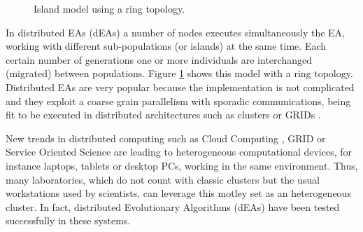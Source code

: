\documentclass[final,1p,times]{elsarticle}
\begin{document}
\begin{figure}[htb]
\centering
{}
\caption{Island model using a ring topology.}
\label{fig:islands}
\end{figure}


In distributed EAs (dEAs) a number of nodes executes simultaneously the EA, working with different sub-populations (or islands) at the same time. Each certain number of generations one or more individuals are interchanged (migrated) between populations. Figure \ref{fig:islands} shows this model with a ring topology. Distributed EAs are very popular because the implementation is
not complicated  %
 and they exploit a coarse grain parallelism with sporadic %
 communications, being fit to be executed in distributed architectures
 such as clusters or GRIDs \cite{PLATO}. %





New trends in distributed computing such as Cloud Computing \cite{CLOUD}, GRID
\cite{OPENSCIENCEGRID} or Service Oriented Science \cite{GLOBUS} are
leading to heterogeneous computational devices, for instance laptops,
tablets or desktop PCs, working in the same
environment. Thus, many laboratories, which do not count with classic
clusters but the usual workstations used by scientists, can leverage
this motley set as an heterogeneous cluster. In fact, distributed Evolutionary
Algorithms (dEAs) \cite{MULTIKULTI,PARALLELGRIDHETEROGENEOUS} have been tested successfully in these
systems.  %
\end{document}

